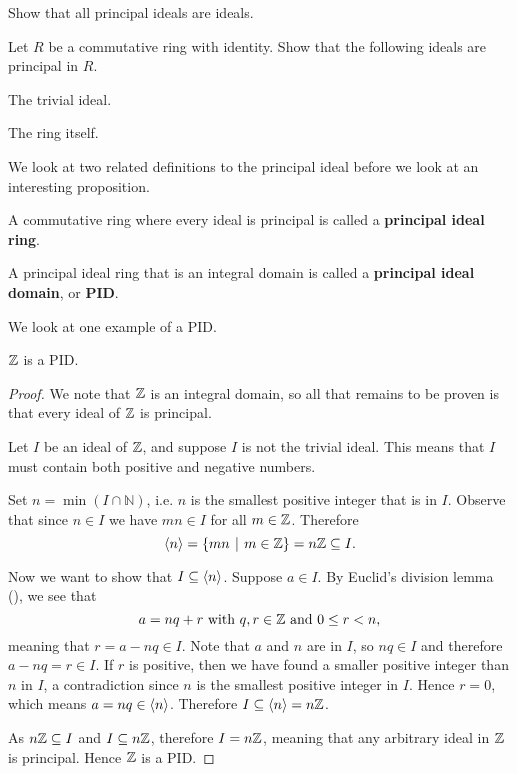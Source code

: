 \begin{exercise}\label{exercise-principal-ideal-is-ideal}
    Show that all principal ideals are ideals.
\end{exercise}
\begin{exercise}\label{exercise-trivial-ideal-and-whole-ring-are-principal-ideals}
    Let $R$ be a commutative ring with identity. Show that the following ideals are principal in $R$.
    \begin{partquestions}{\alph*}
        \item The trivial ideal.
        \item The ring itself.
    \end{partquestions}
\end{exercise}

We look at two related definitions to the principal ideal before we look at an interesting proposition.
\begin{definition}
    A commutative ring where every ideal is principal is called a \textbf{principal ideal ring}.
\end{definition}
\begin{definition}
    A principal ideal ring that is an integral domain is called a \textbf{principal ideal domain}, or \textbf{PID}.
\end{definition}

We look at one example of a PID.
\begin{proposition}
    $\mathbb{Z}$ is a PID.
\end{proposition}
\begin{proof}
    We note that $\mathbb{Z}$ is an integral domain, so all that remains to be proven is that every ideal of $\mathbb{Z}$ is principal.

    Let $I$ be an ideal of $\mathbb{Z}$, and suppose $I$ is not the trivial ideal. This means that $I$ must contain both positive and negative numbers.
    
    Set $n = \min(I \cap \mathbb{N})$, i.e. $n$ is the smallest positive integer that is in $I$. Observe that since $n \in I$ we have $mn \in I$ for all $m \in \mathbb{Z}$. Therefore
    \[
        \princ{n} = \{mn \vert m \in \Z\} = n\Z \subseteq I.
    \]

    Now we want to show that $I \subseteq \left\langle n\right\rangle$. Suppose $a \in I$. By Euclid's division lemma (), we see that
    \[
        a = nq + r \text{ with } q,r\in\mathbb{Z} \text{ and } 0 \leq r < n,
    \]
    meaning that $r = a - nq \in I$. Note that $a$ and $n$ are in $I$, so $nq \in I$ and therefore $a - nq = r \in I$. If $r$ is positive, then we have found a smaller positive integer than $n$ in $I$, a contradiction since $n$ is the smallest positive integer in $I$. Hence $r = 0$, which means $a = nq \in \left\langle n\right\rangle$. Therefore $I \subseteq \left\langle n\right\rangle = n\mathbb{Z}$.

    As $n\mathbb{Z} \subseteq I$ and $I \subseteq n\mathbb{Z}$, therefore $I = n\mathbb{Z}$, meaning that any arbitrary ideal in $\mathbb{Z}$ is principal. Hence $\mathbb{Z}$ is a PID.
\end{proof}


